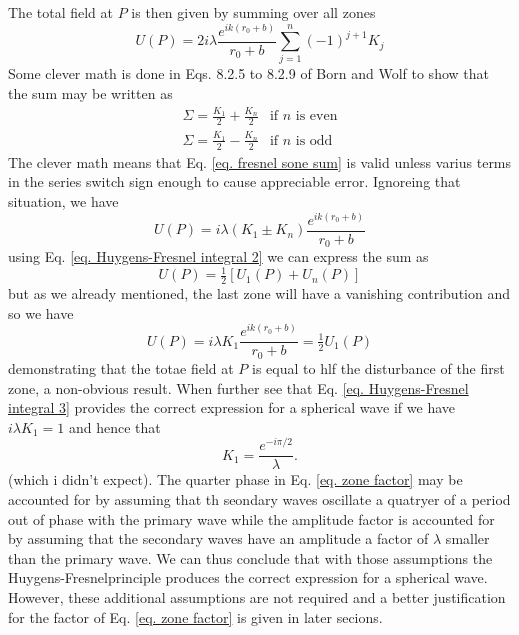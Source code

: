\documentclass[../../main.tex]{subfiles} %
\begin{document}
The total field at $P$ is then given by summing over all zones
\begin{equation}\label{eq. Huygens-Fresnel integral 2}
    U(P)=2i\lambda\frac{e^{ik(r_0+b)}}{r_0+b}\sum_{j=1}^n (-1)^{j+1}K_j
\end{equation}
Some clever math is done in Eqs. 8.2.5 to 8.2.9 of Born and Wolf to show that the sum may be written as
\begin{equation}\label{eq. fresnel sone sum}
    \begin{aligned}
    \Sigma=\frac{K_1}{2}+\frac{K_n}{2} & \text{if $n$ is even}\\
    \Sigma=\frac{K_1}{2}-\frac{K_n}{2} & \text{if $n$ is odd}
    \end{aligned}
\end{equation}
The clever math means that Eq. \ref{eq. fresnel sone sum} is valid unless varius terms in the series switch sign enough to cause appreciable error. Ignoreing that situation, we have
\begin{equation}
    U(P)=i\lambda(K_1\pm K_n)\frac{e^{ik(r_0+b)}}{r_0+b}
\end{equation}
using Eq. \ref{eq. Huygens-Fresnel integral 2} we can express the sum as 
\begin{equation}
    U(P)=\tfrac12[U_1(P)+U_n(P)]
\end{equation}
but as we already mentioned, the last zone will have a vanishing contribution and so we have
\begin{equation}\label{eq. Huygens-Fresnel integral 3}
    U(P)=i\lambda K_1\frac{e^{ik(r_0+b)}}{r_0+b}=\tfrac12 U_1(P)
\end{equation}
demonstrating that the totae field at $P$ is equal to hlf the disturbance of the first zone, a non-obvious result. When further see that Eq. \ref{eq. Huygens-Fresnel integral 3} provides the correct expression for a spherical wave if we have $i\lambda K_1=1$ and hence that 
\begin{equation}\label{eq. zone factor}
    K_1=\frac{e^{-i\pi/2}}{\lambda}.
\end{equation}
(which i didn't expect). The quarter phase in Eq. \ref{eq. zone factor} may be accounted for by assuming that th seondary waves oscillate a quatryer of a period out of phase with the primary wave while the amplitude factor is accounted for by assuming that the secondary waves have an amplitude a factor of $\lambda$ smaller than the primary wave. We can thus conclude that with those assumptions the Huygens-Fresnelprinciple produces the correct expression for a spherical wave. However, these additional assumptions are not required and a better justification for the factor of Eq. \ref{eq. zone factor} is given in later secions. 
\end{document}
